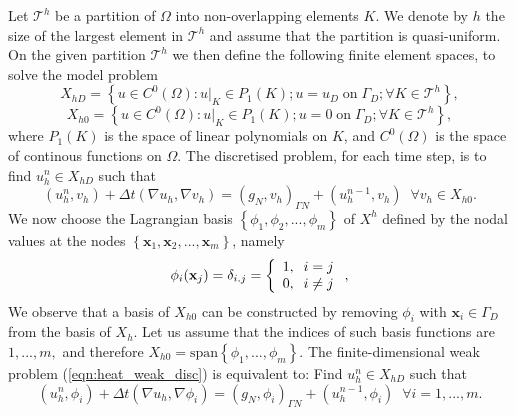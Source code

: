 Let $\mathcal{T}^{h}$ be a partition of $\Omega$ into non-overlapping elements $K$. We denote by $h$ the size of the largest element in $\mathcal{T}^{h}$ and assume that the partition is quasi-uniform. On the given partition $\mathcal{T}^{h}$  we then define the following  finite element spaces, to solve the model problem
%
\begin{equation*}
X_{hD}=\left\lbrace u  \in C^{0}(\Omega) : u |_{K} \in P_{1}(K); u  = u_{D} \;\mbox{on} \;\Gamma_{D} ; \forall K \in \mathcal{T}^{h} \right\rbrace,
\label{eqn:fespace_modelD}
\end{equation*}
\begin{equation*}
X_{h0}=\left\lbrace u  \in C^{0}(\Omega) : u |_{K} \in P_{1}(K); u  = 0 \;\mbox{on} \;\Gamma_{D} ; \forall K \in \mathcal{T}^{h} \right\rbrace,
\label{eqn:fespace_model0}
\end{equation*}
where  $P_{1}(K)$ is the space of linear polynomials on $K$, and $C^{0}(\Omega)$ is the space of continous functions on $\Omega$. The discretised problem, for each time step, is to find $u^{n}_{h}\in X_{hD}$ such that 
\begin{equation}
\left( u^{n}_{h},v_{h} \right) + \Delta t \left(\nabla u_{h},\nabla v_{h} \right)=\left(g_{N} ,v_{h} \right)_{\Gamma N}+\left( u^{n-1}_{h},v_{h} \right) \;\;\forall v_{h} \in X_{h0}.
\label{eqn:heat_weak_disc}
\end{equation}
We now choose the Lagrangian basis $\left\lbrace \phi_{1},\phi_{2},...,\phi_{m} \right\rbrace$ of $X^{h}$ defined by the nodal values at the nodes $\left\lbrace \mathbf{x}_{1},\mathbf{x}_{2},...,\mathbf{x}_{m} \right\rbrace$, namely
%
\begin{equation*}
\phi_{i}(\mathbf{x}_{j}) =\delta_{i.j}= \left\lbrace
  \begin{array}{l l}
    1,\;\;i=j\\    
    0,\;\;i \neq j
  \end{array} \right. ,
\end{equation*}
%
%
We observe that a basis of $X_{h0}$ can be constructed by removing $\phi_{i}$ with $\mathbf{x}_{i}\in \Gamma_{D}$ from the basis of $X_{h}$. Let us assume that the indices of such basis functions are
$1,...,m,$ and therefore $X_{h0} = \mbox{span}\left\lbrace \phi_{1},...,\phi_{m} \right\rbrace$. The finite-dimensional weak
problem (\ref{eqn:heat_weak_disc}) is equivalent to: Find $u^{n}_{h}\in X_{hD}$ such that 
\begin{equation}
\left( u^{n}_{h},\phi_{i} \right) + \Delta t \left(\nabla u_{h},\nabla \phi_{i} \right)=\left(g_{N} ,\phi_{i} \right)_{\Gamma N}+\left( u^{n-1}_{h},\phi_{i} \right) \;\;\forall i=1,...,m.
\label{eqn:heat_weak_basis}
\end{equation}
